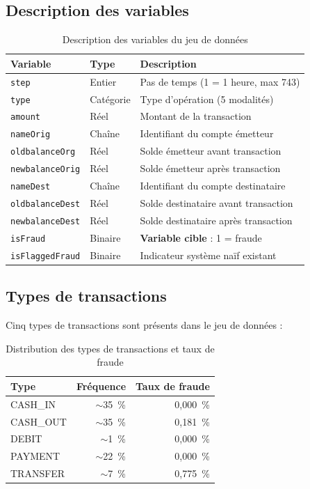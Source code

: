 \documentclass[12pt,a4paper,twoside]{report}
\begin{document}
\subsection{Description des variables}

\begin{table}[H]
\centering
\caption{Description des variables du jeu de données}
\label{tab:variables}
\begin{tabular}{lll}
\toprule
\textbf{Variable} & \textbf{Type} & \textbf{Description} \\
\midrule
\texttt{step}           & Entier    & Pas de temps (1 = 1 heure, max 743) \\
\texttt{type}           & Catégorie & Type d'opération (5 modalités) \\
\texttt{amount}         & Réel      & Montant de la transaction \\
\texttt{nameOrig}       & Chaîne    & Identifiant du compte émetteur \\
\texttt{oldbalanceOrg}  & Réel      & Solde émetteur avant transaction \\
\texttt{newbalanceOrig} & Réel      & Solde émetteur après transaction \\
\texttt{nameDest}       & Chaîne    & Identifiant du compte destinataire \\
\texttt{oldbalanceDest} & Réel      & Solde destinataire avant transaction \\
\texttt{newbalanceDest} & Réel      & Solde destinataire après transaction \\
\texttt{isFraud}        & Binaire   & \textbf{Variable cible} : 1 = fraude \\
\texttt{isFlaggedFraud} & Binaire   & Indicateur système naïf existant \\
\bottomrule
\end{tabular}
\end{table}

\subsection{Types de transactions}

Cinq types de transactions sont présents dans le jeu de données :

\begin{table}[H]
\centering
\caption{Distribution des types de transactions et taux de fraude}
\label{tab:types_transactions}
\begin{tabular}{lrr}
\toprule
\textbf{Type} & \textbf{Fréquence} & \textbf{Taux de fraude} \\
\midrule
CASH\_IN   & $\sim$35~\% & 0,000~\% \\
CASH\_OUT  & $\sim$35~\% & 0,181~\% \\
DEBIT      & $\sim$1~\%  & 0,000~\% \\
PAYMENT    & $\sim$22~\% & 0,000~\% \\
TRANSFER   & $\sim$7~\%  & 0,775~\% \\
\bottomrule
\end{tabular}
\end{table}
\end{document}
